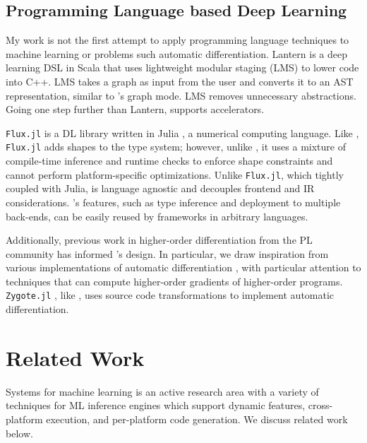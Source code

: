 \subsection{Programming Language based Deep Learning}

My work is not the first attempt to apply programming language
    techniques to machine learning or problems such automatic differentiation.
Lantern \citep{lantern} is a deep learning DSL in Scala
    that uses lightweight modular staging (LMS) to lower code into C++.
LMS takes a graph as input from the user and converts it to an AST
    representation, similar to \relay's graph mode.
LMS removes unnecessary abstractions.
Going one step further than Lantern,
    \relay supports accelerators.

\verb|Flux.jl| \citep{fluxjl} is a DL library written in Julia \citep{julia}, a numerical
computing language. Like \relay, \verb|Flux.jl| adds shapes to the type system; however, unlike \relay, it
uses a mixture of compile-time inference and runtime checks to enforce shape constraints
\citep{jlmlpl} and cannot perform platform-specific optimizations. Unlike \verb|Flux.jl|, which
tightly coupled with Julia, \relay is language agnostic and decouples frontend and IR
considerations.
\relay's features, such as type inference and deployment to multiple back-ends, can
    be easily reused by frameworks in arbitrary languages.

Additionally, previous work in higher-order differentiation from the PL community
has informed \relay's design.
In particular, we draw inspiration from various implementations of
automatic differentiation \citep{beautiful_diff, ad_survey, haskell_ad, toplas_reverse, wang_reverse, DLS, DDF},
with particular attention to techniques that can compute higher-order gradients of higher-order programs.
\verb|Zygote.jl| \citep{zygotejl}, like \relay, uses source code transformations to
    implement automatic differentiation.


\section{Related Work}
\label{sec:relwk}

Systems for machine learning is an active research area with a variety of techniques for ML inference engines which support dynamic features, cross-platform execution, and per-platform code generation. We discuss related work below.

